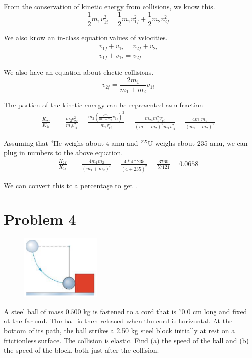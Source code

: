 \documentclass[12pt]{article}
\begin{document}
From the conservation of kinetic energy from collisions, we know this.
\begin{equation}
    \frac{1}{2}m_1v_{1i}^2 = \frac{1}{2}m_1v_{1f}^2 + \frac{1}{2}m_2v_{2f}^2
\end{equation}

We also know an in-class equation values of velocities.
\begin{gather}
    v_{1f} + v_{1i} = v_{2f} + v_{2i}\\
    v_{1f} + v_{1i} = v_{2f}
\end{gather}

We also have an equation about elactic collisions.
\begin{equation}
    v_{2f} = \frac{2m_1}{m_1 + m_2}v_{1i}
\end{equation}

The portion of the kinetic energy can be represented as a fraction.
\begin{align}
    \frac{K_{2f}}{K_{1i}}   &=  \frac{m_2v_{2f}^2}{m_1v_{1i}^2}
        =   \frac{m_2\left(\frac{2m_1}{m_1 + m_2}v_{1i}\right)^2}{m_1v_{1i}^2}
        =   \frac{m_24m_1^2v_{1i}^2}{(m_1+m_2)^2m_1v_{1i}^2}
        =   \frac{4m_1m_2}{(m_1+m_2)^2}
\end{align}

Assuming that $^4$He weighs about 4 amu and $^{235}$U weighs about 235 amu, we can plug in numbers to the above equation.
\begin{align}
    \frac{K_{2f}}{K_{1i}}   &=  \frac{4m_1m_2}{(m_1+m_2)^2}
        =   \frac{4*4*235}{(4+235)^2}
        =   \frac{3760}{57121}
        =   0.0658
\end{align}

We can convert this to a percentage to get .


\pagebreak
\section*{Problem 4}
\begin{figure}
    \vspace{-30pt}
    \includegraphics[width=0.35\textwidth]{graph_4.png} 
\end{figure}
A steel ball of mass 0.500 kg is fastened to a cord that is 70.0 cm long and fixed at the far end. The
ball is then released when the cord is horizontal. At the bottom of its path, the ball strikes a 2.50 kg steel
block initially at rest on a frictionless surface. The collision is elastic. Find (a) the speed of the ball and
(b) the speed of the block, both just after the collision.
\end{document}
